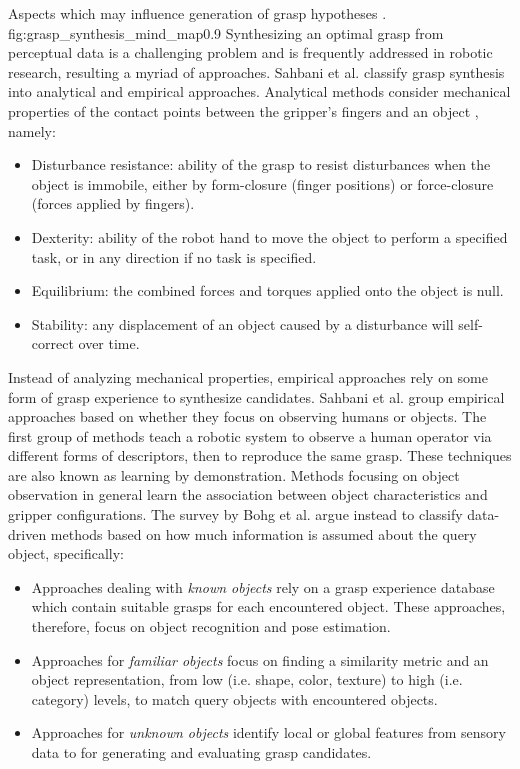              {Aspects which may influence generation of grasp hypotheses \cite{Bohg2014}.}
             {fig:grasp_synthesis_mind_map}{0.9\textwidth}
Synthesizing an optimal grasp from perceptual data is a challenging problem and is frequently addressed in
robotic research, resulting a myriad of approaches. Sahbani et al. \cite{Sahbani2012} classify grasp synthesis
into analytical and empirical approaches. Analytical methods consider mechanical properties of the contact
points between the gripper's fingers and an object \cite{Roa2015,Sahbani2012,Shimoga1996}, namely:
\begin{itemize}
\item Disturbance resistance: ability of the grasp to resist disturbances when the object is immobile, either by
form-closure (finger positions) or force-closure (forces applied by fingers).
\item Dexterity: ability of the robot hand to move the object to perform a specified task, or in any direction if
no task is specified.
\item Equilibrium: the combined forces and torques applied onto the object is null.
\item Stability: any displacement of an object caused by a disturbance will self-correct over time.
\end{itemize}
Instead of analyzing mechanical properties, empirical approaches rely on some form of grasp experience to synthesize
candidates. Sahbani et al. \cite{Sahbani2012} group empirical approaches based on whether they focus on observing humans
or objects. The first group of methods teach a robotic system to observe a human operator via different forms of
descriptors, then to reproduce the same grasp. These techniques are also known as learning by demonstration.
Methods focusing on object observation in general learn the association between object characteristics and gripper
configurations. The survey by Bohg et al. \cite{Bohg2014} argue instead to classify data-driven methods based on how
much information is assumed about the query object, specifically:
\begin{itemize}
    \item Approaches dealing with \emph{known objects} rely on a grasp experience database which contain suitable grasps
    for each encountered object. These approaches, therefore, focus on object recognition and pose estimation.
    \item Approaches for \emph{familiar objects} focus on finding a similarity metric and an object representation,
    from low (i.e. shape, color, texture) to high (i.e. category) levels, to match query objects with encountered
    objects.
    \item Approaches for \emph{unknown objects} identify local or global features from sensory data to for generating
    and evaluating grasp candidates.
\end{itemize}
